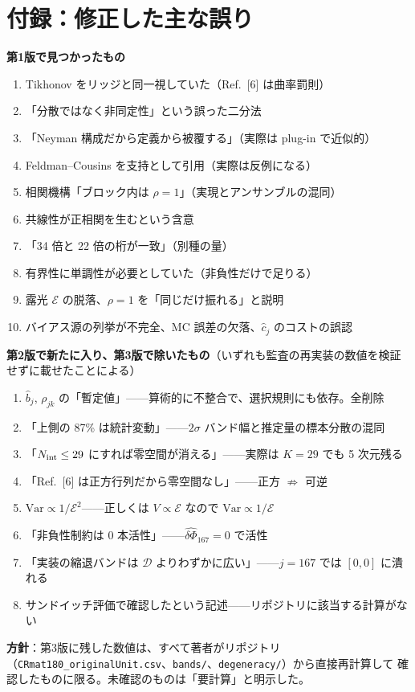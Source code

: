 \documentclass[11pt,a4paper]{ltjsarticle}
\newcommand{\dPh}{\widehat{\delta\Phi}}
\newcommand{\Var}{\mathrm{Var}}
\newcommand{\Nint}{N_{\rm int}}
\begin{document}
\section*{付録：修正した主な誤り}
\textbf{第1版で見つかったもの}
\begin{enumerate}\itemsep0pt
\item Tikhonov をリッジと同一視していた（Ref.~[6] は曲率罰則）
\item 「分散ではなく非同定性」という誤った二分法
\item 「Neyman 構成だから定義から被覆する」（実際は plug-in で近似的）
\item Feldman--Cousins を支持として引用（実際は反例になる）
\item 相関機構「ブロック内は $\rho=1$」（実現とアンサンブルの混同）
\item 共線性が正相関を生むという含意
\item 「34 倍と 22 倍の桁が一致」（別種の量）
\item 有界性に単調性が必要としていた（非負性だけで足りる）
\item 露光 $\mathcal{E}$ の脱落、$\rho=1$ を「同じだけ振れる」と説明
\item バイアス源の列挙が不完全、MC 誤差の欠落、$\hat c_j$ のコストの誤認
\end{enumerate}

\textbf{第2版で新たに入り、第3版で除いたもの}（いずれも監査の再実装の数値を検証せずに載せたことによる）
\begin{enumerate}\itemsep0pt
\item $\hat b_j$, $\rho_{jk}$ の「暫定値」——算術的に不整合で、選択規則にも依存。全削除
\item 「上側の 87\% は統計変動」——$2\sigma$ バンド幅と推定量の標本分散の混同
\item 「$\Nint\le29$ にすれば零空間が消える」——実際は $K=29$ でも 5 次元残る
\item 「Ref.~[6] は正方行列だから零空間なし」——正方 $\not\Rightarrow$ 可逆
\item $\Var\propto1/\mathcal{E}^2$——正しくは $V\propto\mathcal{E}$ なので $\Var\propto1/\mathcal{E}$
\item 「非負性制約は 0 本活性」——$\dPh_{167}=0$ で活性
\item 「実装の縮退バンドは $\mathcal{D}$ よりわずかに広い」——$j=167$ では $[0,0]$ に潰れる
\item サンドイッチ評価で確認したという記述——リポジトリに該当する計算がない
\end{enumerate}

\textbf{方針}：第3版に残した数値は、すべて著者がリポジトリ
（\texttt{CRmat180\_originalUnit.csv}、\texttt{bands/}、\texttt{degeneracy/}）から直接再計算して
確認したものに限る。未確認のものは「要計算」と明示した。
\end{document}
